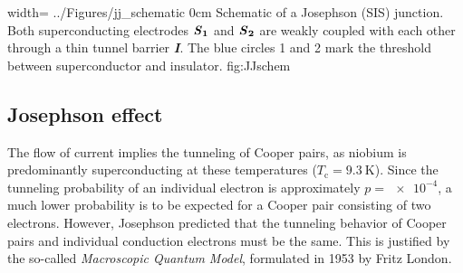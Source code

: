 {width=\textwidth}
{../Figures/jj_schematic}
{0cm}
{Schematic of a Josephson (SIS) junction. Both superconducting electrodes $\textbf{\textit{S}}_\textbf{1}$ and $\textbf{\textit{S}}_\textbf{2}$ are weakly coupled with each other through a thin tunnel barrier \textbf{\textit{I}}. The blue circles 1 and 2 mark the threshold between superconductor and insulator.}
{fig:JJschem}


        
\subsection{Josephson effect}


The flow of current implies the tunneling of Cooper pairs, as niobium is predominantly superconducting at these temperatures ($T_\mathrm{c} = \qty{9.3}{\kelvin}$). Since the tunneling probability of an individual electron is approximately $p = \num{e-4}$, a much lower probability is to be expected for a Cooper pair consisting of two electrons. However, Josephson predicted that the tunneling behavior of Cooper pairs and individual conduction electrons must be the same. This is justified by the so-called \textit{Macroscopic Quantum Model}, formulated in 1953 by Fritz London.

